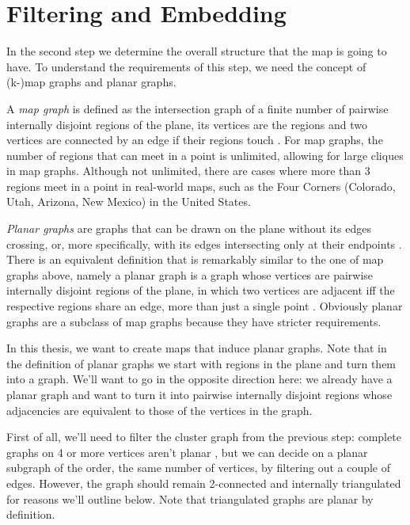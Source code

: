 \section{Filtering and Embedding}
\label{sect:filtering-and-embedding}

In the second step we determine the overall structure that the map is going to have. To understand the requirements of this step, we need the concept of (k-)map graphs and planar graphs.

A \emph{map graph} is defined as the intersection graph of a finite number of pairwise internally disjoint regions of the plane, \ie{} its vertices are the regions and two vertices are connected by an edge if their regions touch \cite{chen2002map}. For map graphs, the number of regions that can meet in a point is unlimited, allowing for large cliques in map graphs. Although not unlimited, there are cases where more than 3 regions meet in a point in real-world maps, such as the Four Corners (Colorado, Utah, Arizona, New Mexico) in the United States.

\emph{Planar graphs} are graphs that can be drawn on the plane without its edges crossing, or, more specifically, with its edges intersecting only at their endpoints \cite{wagner2016algorithmen}. There is an equivalent definition that is remarkably similar to the one of map graphs above, namely a planar graph is a graph whose vertices are pairwise internally disjoint regions of the plane, in which two vertices are adjacent iff the respective regions share an edge, \ie{} more than just a single point \cite{chen2002map}. Obviously planar graphs are a subclass of map graphs because they have stricter requirements.

In this thesis, we want to create maps that induce planar graphs. Note that in the definition of  planar graphs we start with regions in the plane and turn them into a graph. We'll want to go in the opposite direction here: we already have a planar graph and want to turn it into pairwise internally disjoint regions whose adjacencies are equivalent to those of the vertices in the graph.

First of all, we'll need to filter the cluster graph from the previous step: complete graphs on 4 or more vertices aren't planar \cite{wagner2016algorithmen}, but we can decide on a planar subgraph of the order, \ie{} the same number of vertices, by filtering out a couple of edges. However, the graph should remain 2-connected and internally triangulated for reasons we'll outline below. Note that triangulated graphs are planar by definition.

